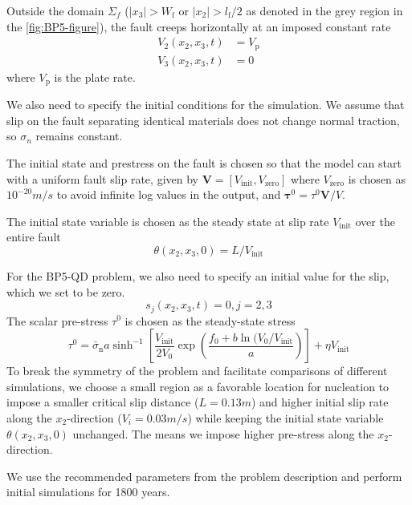 Outside the domain $\Sigma_f$ ($|x_3| > W_\text{f}$ or $|x_2| > l_\text{f} / 2$ as denoted in the grey region in the \autoref{fig:BP5-figure}), the fault creeps horizontally at an imposed constant rate
\begin{align}
    V_2(x_2, x_3, t) &= V_\text{p} \\
    V_3(x_2, x_3, t) &= 0
\end{align}
where $V_\text{p}$ is the plate rate.

We also need to specify the initial conditions for the simulation.
We assume that slip on the fault separating identical materials does not change normal traction, so $\sigma_n$ remains constant.

The initial state and prestress on the fault is chosen so that the model can start with a uniform fault slip rate, given by $\textbf{V} = [V_\text{init}, V_\text{zero}]$ where $V_\text{zero}$ is chosen as $10^{-20}m/s$ to avoid infinite log values in the output, and $\boldsymbol{\tau}^0 = \tau^0 \textbf{V} / V$.

The initial state variable is chosen as the steady state at slip rate $V_\text{init}$ over the entire fault 
\begin{equation}
    \theta(x_2, x_3, 0) = L / V_\text{init}
\end{equation}

For the BP5-QD problem, we also need to specify an initial value for the slip, which we set to be zero.
\begin{equation}
    s_j(x_2, x_3, t) = 0, j = 2, 3
\end{equation}
The scalar pre-stress $\tau^0$ is chosen as the steady-state stress
\begin{equation}
    \tau^0 = \bar{\sigma}_\text{n} a \sinh^{-1}[\frac{V_\text{init}}{2V_0}\exp(\frac{f_0 + b\ln(V_0/V_\text{init}}{a})] + \eta V_\text{init}
\end{equation}
To break the symmetry of the problem and facilitate comparisons of different simulations, we choose a small region as a favorable location for nucleation to impose a smaller critical slip distance ($L=0.13m$) and higher initial slip rate along the $x_2$-direction ($V_i = 0.03 m/s$) while keeping the initial state variable $\theta(x_2, x_3, 0)$ unchanged. The means we impose higher pre-stress along the $x_2$-direction.

We use the recommended parameters from the problem description and perform initial simulations for 1800 years.

